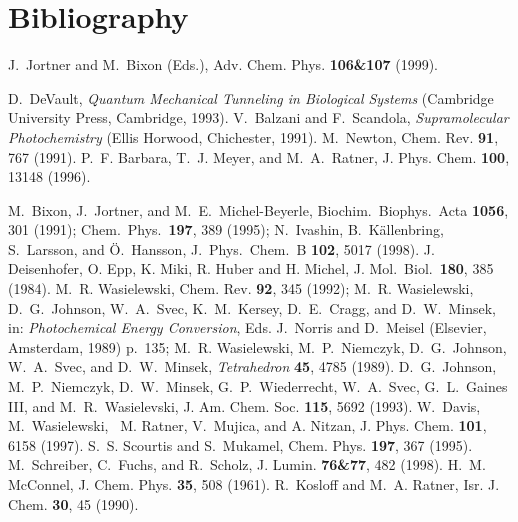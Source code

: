 \documentclass[12pt,twoside,a4paper]{report}
\begin{document}
{\chapter*{Bibliography}
\begin{thebibliography}{999}
      J.~Jortner and M.~Bixon (Eds.),  Adv. Chem. Phys.  {\bf 106\&107}  (1999).




          D.~DeVault, {\it Quantum Mechanical Tunneling in  Biological Systems} (Cambridge University Press,  Cambridge, 1993).
          V.~Balzani and F.~Scandola, {\it Supramolecular Photochemistry} (Ellis Horwood, Chichester, 1991).
         M.~Newton, Chem. Rev. {\bf 91}, 767 (1991).
          P.~F. Barbara, T.~J. Meyer, and M.~A.~Ratner, { J. Phys. Chem.}  {\bf 100}, 13148 (1996).



      M.~Bixon, J.~Jortner, and M.~E.~Michel-Beyerle,
                      Biochim.\ Biophys.\ Acta {\bf 1056}, 301 (1991); Chem.\ Phys.\
                      {\bf 197}, 389 (1995);
                      N.~Ivashin, B.~K\"allenbring, S.~Larsson, and \"O.~Hansson,
                      J.~Phys.~Chem.~B {\bf 102}, 5017 (1998).
      J. Deisenhofer, O. Epp, K. Miki, R. Huber and H.
                      Michel, J. Mol.\ Biol.\ {\bf 180}, 385 (1984).
\bibitem{w1}      M.~R. Wasielewski, {Chem. Rev.} {\bf 92}, 345 (1992);
                  M.~R. Wasielewski, D.~G.~Johnson, W.~A.~Svec,
                  K.~M.~Kersey, D.~E.~Cragg, and D.~W.~Minsek, in: {\it Photochemical Energy Conversion},
                  Eds. J.~Norris and  D.~Meisel (Elsevier, Amsterdam, 1989) p.~135;
                  M.~R. Wasielewski, M.~P.~Niemczyk, D.~G.~Johnson, W.~A.~Svec,                  
                  and D.~W.~Minsek, {\it Tetrahedron} {\bf 45}, 4785 (1989).
\bibitem{j1}      D.~G.~Johnson, M.~P.~Niemczyk, D.~W.~Minsek, G.~P.~Wiederrecht, 
                  W.~A.~Svec, G.~L.~Gaines III, and M.~R.~Wasielevski, {J. Am. Chem. Soc.} {\bf 115}, 5692 (1993).
\bibitem{d2}      W.~Davis, M.~Wasielewski, ~M. Ratner, V.~Mujica, and A. Nitzan, {  J. Phys. Chem.}  {\bf 101}, 6158 (1997).
\bibitem{skou95}      S.~S. Scourtis and S.~Mukamel, {  Chem. Phys.}  {\bf 197}, 367 (1995).
\bibitem{schr98b}      M.~Schreiber, C.~Fuchs, and R.~Scholz, {  J.  Lumin.} {\bf 76\&77}, 482 (1998).
\bibitem{m6}      H.~M. McConnel, {  J. Chem. Phys.}  {\bf 35}, 508 (1961).
\bibitem{k8}      R.~Kosloff and M.~A. Ratner, {Isr. J. Chem.}  {\bf 30}, 45 (1990).


\end{thebibliography}}
\end{document}
